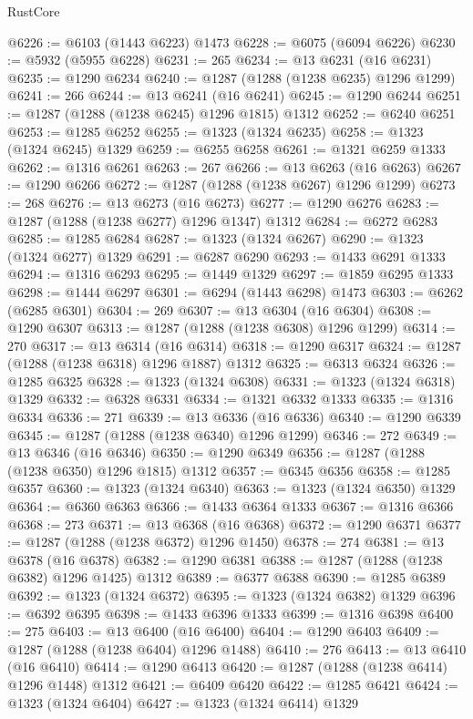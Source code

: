 \begin{lexlean}{RustCore}
\begin{coremodule}
@6226 := @6103 (@1443 @6223) @1473
@6228 := @6075 (@6094 @6226)
@6230 := @5932 (@5955 @6228)
@6231 := 265
@6234 := @13 @6231 (@16 @6231)
@6235 := @1290 @6234
@6240 := @1287 (@1288 (@1238 @6235) @1296 @1299)
@6241 := 266
@6244 := @13 @6241 (@16 @6241)
@6245 := @1290 @6244
@6251 := @1287 (@1288 (@1238 @6245) @1296 @1815) @1312
@6252 := @6240 @6251
@6253 := @1285 @6252
@6255 := @1323 (@1324 @6235)
@6258 := @1323 (@1324 @6245) @1329
@6259 := @6255 @6258
@6261 := @1321 @6259 @1333
@6262 := @1316 @6261
@6263 := 267
@6266 := @13 @6263 (@16 @6263)
@6267 := @1290 @6266
@6272 := @1287 (@1288 (@1238 @6267) @1296 @1299)
@6273 := 268
@6276 := @13 @6273 (@16 @6273)
@6277 := @1290 @6276
@6283 := @1287 (@1288 (@1238 @6277) @1296 @1347) @1312
@6284 := @6272 @6283
@6285 := @1285 @6284
@6287 := @1323 (@1324 @6267)
@6290 := @1323 (@1324 @6277) @1329
@6291 := @6287 @6290
@6293 := @1433 @6291 @1333
@6294 := @1316 @6293
@6295 := @1449 @1329
@6297 := @1859 @6295 @1333
@6298 := @1444 @6297
@6301 := @6294 (@1443 @6298) @1473
@6303 := @6262 (@6285 @6301)
@6304 := 269
@6307 := @13 @6304 (@16 @6304)
@6308 := @1290 @6307
@6313 := @1287 (@1288 (@1238 @6308) @1296 @1299)
@6314 := 270
@6317 := @13 @6314 (@16 @6314)
@6318 := @1290 @6317
@6324 := @1287 (@1288 (@1238 @6318) @1296 @1887) @1312
@6325 := @6313 @6324
@6326 := @1285 @6325
@6328 := @1323 (@1324 @6308)
@6331 := @1323 (@1324 @6318) @1329
@6332 := @6328 @6331
@6334 := @1321 @6332 @1333
@6335 := @1316 @6334
@6336 := 271
@6339 := @13 @6336 (@16 @6336)
@6340 := @1290 @6339
@6345 := @1287 (@1288 (@1238 @6340) @1296 @1299)
@6346 := 272
@6349 := @13 @6346 (@16 @6346)
@6350 := @1290 @6349
@6356 := @1287 (@1288 (@1238 @6350) @1296 @1815) @1312
@6357 := @6345 @6356
@6358 := @1285 @6357
@6360 := @1323 (@1324 @6340)
@6363 := @1323 (@1324 @6350) @1329
@6364 := @6360 @6363
@6366 := @1433 @6364 @1333
@6367 := @1316 @6366
@6368 := 273
@6371 := @13 @6368 (@16 @6368)
@6372 := @1290 @6371
@6377 := @1287 (@1288 (@1238 @6372) @1296 @1450)
@6378 := 274
@6381 := @13 @6378 (@16 @6378)
@6382 := @1290 @6381
@6388 := @1287 (@1288 (@1238 @6382) @1296 @1425) @1312
@6389 := @6377 @6388
@6390 := @1285 @6389
@6392 := @1323 (@1324 @6372)
@6395 := @1323 (@1324 @6382) @1329
@6396 := @6392 @6395
@6398 := @1433 @6396 @1333
@6399 := @1316 @6398
@6400 := 275
@6403 := @13 @6400 (@16 @6400)
@6404 := @1290 @6403
@6409 := @1287 (@1288 (@1238 @6404) @1296 @1488)
@6410 := 276
@6413 := @13 @6410 (@16 @6410)
@6414 := @1290 @6413
@6420 := @1287 (@1288 (@1238 @6414) @1296 @1448) @1312
@6421 := @6409 @6420
@6422 := @1285 @6421
@6424 := @1323 (@1324 @6404)
@6427 := @1323 (@1324 @6414) @1329

\end{coremodule}
\end{lexlean}
